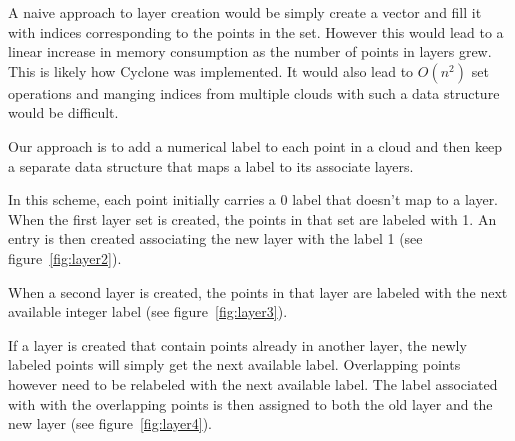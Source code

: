 A naive approach to layer creation would be simply create a vector and fill it with indices corresponding to the points in the set. However this would lead to a linear increase in memory consumption as the number of points in layers grew. This is likely how Cyclone was implemented. It would also lead to $O(n^{2})$ set operations and manging indices from multiple clouds with such a data structure would be difficult.

Our approach is to add a numerical label to each point in a cloud and then keep a separate data structure that maps a label to its associate layers.


In this scheme, each point initially carries a 0 label that doesn't map to a layer. When the first layer set is created, the points in that set are labeled with 1. An entry is then created associating the new layer with the label 1 (see figure~\ref{fig:layer2}).

When a second layer is created, the points in that layer are labeled with the next available integer label (see figure~\ref{fig:layer3}).

If a layer is created that contain points already in another layer, the newly labeled points will simply get the next available label. Overlapping points however need to be relabeled with the next available label. The label associated with with the overlapping points is then assigned to both the old layer and the new layer (see figure~\ref{fig:layer4}).


